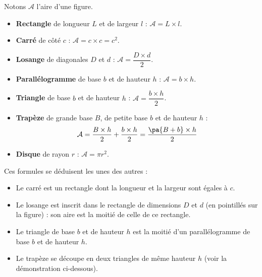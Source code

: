 \begin{prop}
\begin{center}
	\end{center}

	Notons $\mathcal{A}$ l'aire d'une figure.

	\begin{itemize}
		\item \textbf{Rectangle} de longueur $L$ et de largeur $l$ : $\mathcal{A} = L \times l$.
		\item \textbf{Carré} de côté $c$ : $\mathcal{A} = c \times c = c^2$.
		\item \textbf{Losange} de diagonales $D$ et $d$ : $\mathcal{A} = \dfrac{D \times d}{2}$.
		\item \textbf{Parallélogramme} de base $b$ et de hauteur $h$ : $\mathcal{A} = b \times h$.
		\item \textbf{Triangle} de base $b$ et de hauteur $h$ : $\mathcal{A} = \dfrac{b \times h}{2}$.
		\item \textbf{Trapèze} de grande base $B$, de petite base $b$ et de hauteur $h$ :
		      \[
			      \mathcal{A} = \dfrac{B \times h}{2} + \dfrac{b \times h}{2} = \dfrac{\pa{B + b} \times h}{2}
		      \]
		\item \textbf{Disque} de rayon $r$ : $\mathcal{A} = \pi r^2$.
	\end{itemize}
\end{prop}

\begin{rem}
	Ces formules se déduisent les unes des autres :

	\begin{itemize}
		\item Le carré est un rectangle dont la longueur et la largeur sont égales à $c$.
		\item Le losange est inscrit dans le rectangle de dimensions $D$ et $d$ (en pointillés sur la figure) : son aire est la moitié de celle de ce rectangle.
		\item Le triangle de base $b$ et de hauteur $h$ est la moitié d'un parallélogramme de base $b$ et de hauteur $h$.
		\item Le trapèze se découpe en deux triangles de même hauteur $h$ (voir la démonstration ci-dessous).
	\end{itemize}
\end{rem}

